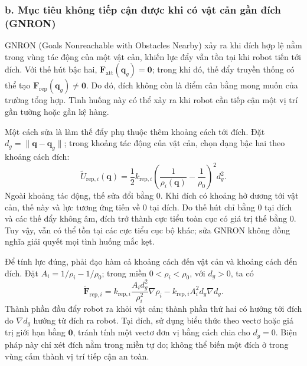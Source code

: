 \documentclass[12pt,a4paper,oneside]{report}
\begin{document}
\subsubsection*{b. Mục tiêu không tiếp cận được khi có vật cản gần đích (GNRON)}

GNRON (Goals Nonreachable with Obstacles Nearby) xảy ra khi đích hợp lệ nằm trong vùng tác động của một vật cản, khiến lực đẩy vẫn tồn tại khi robot tiến tới đích. Với thế hút bậc hai, \(\mathbf{F}_{\mathrm{att}}(\mathbf{q}_g)=\mathbf{0}\); trong khi đó, thế đẩy truyền thống có thể tạo \(\mathbf{F}_{\mathrm{rep}}(\mathbf{q}_g)\neq\mathbf{0}\). Do đó, đích không còn là điểm cân bằng mong muốn của trường tổng hợp. Tình huống này có thể xảy ra khi robot cần tiếp cận một vị trí gần tường hoặc gần kệ hàng.

Một cách sửa là làm thế đẩy phụ thuộc thêm khoảng cách tới đích. Đặt \(d_g=\|\mathbf{q}-\mathbf{q}_g\|\); trong khoảng tác động của vật cản, chọn dạng bậc hai theo khoảng cách đích:
\begin{equation}
  \widetilde{U}_{\mathrm{rep},i}(\mathbf{q})
    =\frac{1}{2}k_{\mathrm{rep},i}
      \left(\frac{1}{\rho_i(\mathbf{q})}-\frac{1}{\rho_0}\right)^{2}
      d_g^{2}.
  \label{eq:gnron-modified-potential}
\end{equation}
Ngoài khoảng tác động, thế sửa đổi bằng \(0\). Khi đích có khoảng hở dương tới vật cản, thế này và lực tương ứng tiến về \(0\) tại đích. Do thế hút chỉ bằng \(0\) tại đích và các thế đẩy không âm, đích trở thành cực tiểu toàn cục có giá trị thế bằng \(0\). Tuy vậy, vẫn có thể tồn tại các cực tiểu cục bộ khác; sửa GNRON không đồng nghĩa giải quyết mọi tình huống mắc kẹt.

Để tính lực đúng, phải đạo hàm cả khoảng cách đến vật cản và khoảng cách đến đích. Đặt \(A_i=1/\rho_i-1/\rho_0\); trong miền \(0<\rho_i<\rho_0\), với \(d_g>0\), ta có
\begin{equation}
  \widetilde{\mathbf{F}}_{\mathrm{rep},i}
    =k_{\mathrm{rep},i}\frac{A_i d_g^{2}}{\rho_i^{2}}\nabla\rho_i
      -k_{\mathrm{rep},i}A_i^{2}d_g\nabla d_g.
  \label{eq:gnron-modified-force}
\end{equation}
Thành phần đầu đẩy robot ra khỏi vật cản; thành phần thứ hai có hướng tới đích do \(\nabla d_g\) hướng từ đích ra robot. Tại đích, sử dụng biểu thức theo vectơ hoặc giá trị giới hạn bằng \(\mathbf{0}\), tránh tính một vectơ đơn vị bằng cách chia cho \(d_g=0\). Biện pháp này chỉ xét đích nằm trong miền tự do; không thể biến một đích ở trong vùng cấm thành vị trí tiếp cận an toàn.
\end{document}
